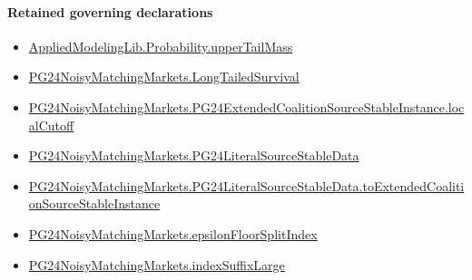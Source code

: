 \documentclass[10pt]{article}
\begin{document}
\paragraph{Retained governing declarations}
\begin{itemize}\raggedright
\item \hyperlink{governing-declaration-f983ca9c59dc317f}{Applied\allowbreak{}Modeling\allowbreak{}Lib.\allowbreak{}Probability.\allowbreak{}upper\allowbreak{}Tail\allowbreak{}Mass}
\item \hyperlink{governing-declaration-e6c10c02961c0451}{PG24\allowbreak{}Noisy\allowbreak{}Matching\allowbreak{}Markets.\allowbreak{}Long\allowbreak{}Tailed\allowbreak{}Survival}
\item \hyperlink{governing-declaration-b9fc570393098049}{PG24\allowbreak{}Noisy\allowbreak{}Matching\allowbreak{}Markets.\allowbreak{}PG24\allowbreak{}Extended\allowbreak{}Coalition\allowbreak{}Source\allowbreak{}Stable\allowbreak{}Instance.\allowbreak{}local\allowbreak{}Cutoff}
\item \hyperlink{governing-declaration-c1ccb10f906ac674}{PG24\allowbreak{}Noisy\allowbreak{}Matching\allowbreak{}Markets.\allowbreak{}PG24\allowbreak{}Literal\allowbreak{}Source\allowbreak{}Stable\allowbreak{}Data}
\item \hyperlink{governing-declaration-5bf4f34082e39c14}{PG24\allowbreak{}Noisy\allowbreak{}Matching\allowbreak{}Markets.\allowbreak{}PG24\allowbreak{}Literal\allowbreak{}Source\allowbreak{}Stable\allowbreak{}Data.\allowbreak{}to\allowbreak{}Extended\allowbreak{}Coalition\allowbreak{}Source\allowbreak{}Stable\allowbreak{}Instance}
\item \hyperlink{governing-declaration-d6708a8061790664}{PG24\allowbreak{}Noisy\allowbreak{}Matching\allowbreak{}Markets.\allowbreak{}epsilon\allowbreak{}Floor\allowbreak{}Split\allowbreak{}Index}
\item \hyperlink{governing-declaration-97886ab309519692}{PG24\allowbreak{}Noisy\allowbreak{}Matching\allowbreak{}Markets.\allowbreak{}index\allowbreak{}Suffix\allowbreak{}Large}
\end{itemize}
\end{document}

